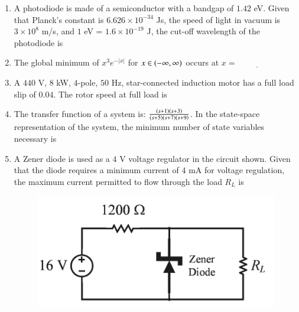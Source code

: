 \documentclass[journal,12pt,onecolumn]{IEEEtran}
\theoremstyle{remark}
\begin{document}
\begin{enumerate}
\hfill{}

\item A photodiode is made of a semiconductor with a bandgap of $1.42$ eV. Given that Planck's constant is $6.626 \times 10^{-34}$ Js, the speed of light in vacuum is $3 \times 10^8$ m/s, and $1$ eV = $1.6 \times 10^{-19}$ J, the cut-off wavelength  of the photodiode is \underline{\hspace{2cm}} 

\hfill{}

\item The global minimum of $x^3 e^{-|x|}$ for $x \in \left(-\infty, \infty\right)$ occurs at $x = \underline{\hspace{2cm}}$ 

\hfill{}

\item A $440$ V, $8$ kW, $4$-pole, $50$ Hz, star-connected induction motor has a full load slip of $0.04$. The rotor speed  at full load is \underline{\hspace{2cm}} 

\hfill{}

\item The transfer function of a system is: $\frac{\left(s+1\right)\left(s+3\right)}{\left(s+5\right)\left(s+7\right)\left(s+9\right)}$. In the state-space representation of the system, the minimum number of state variables  necessary is \underline{\hspace{2cm}}

\hfill{}

\item A Zener diode is used as a $4$ V voltage regulator in the circuit shown. Given that the diode requires a minimum current of $4$ mA for voltage regulation, the maximum current  permitted to flow through the load $R_L$ is \underline{\hspace{2cm}} 

\hfill{}
\begin{figure}[H]
\includegraphics[width = 0.5\columnwidth]{q31}
\caption*{}
\label{fig:q31}
\end{figure}


\end{enumerate}
\end{document}
